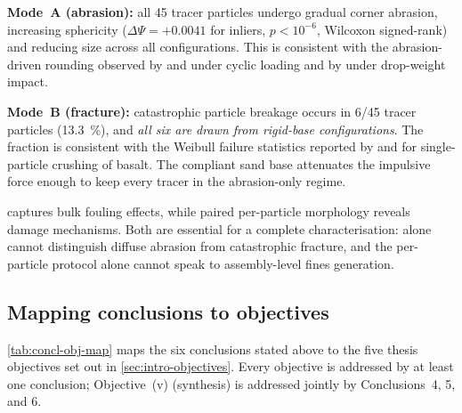 \begin{finding}[title=Conclusion 5 -- Two damage modes]
\textbf{Mode~A (abrasion):} all 45 tracer particles undergo gradual
corner abrasion, increasing sphericity ($\Delta\Psi = +0.0041$ for
inliers, $p < 10^{-6}$, Wilcoxon signed-rank) and reducing size across
all configurations. This is consistent with the abrasion-driven rounding
observed by \citet{Qian2014} and \citet{Guo2018} under cyclic loading
and by \citet{Koohmishi2020} under drop-weight impact.\par
\textbf{Mode~B (fracture):} catastrophic particle breakage occurs in
6/45 tracer particles (\SI{13.3}{\percent}), and \emph{all six are
drawn from rigid-base configurations}. The fraction is consistent with
the Weibull failure statistics reported by \citet{McDowell2002} and
\citet{Lim2004} for single-particle crushing of basalt. The compliant
sand base attenuates the impulsive force enough to keep every tracer in
the abrasion-only regime.
\end{finding}

\begin{finding}[title=Conclusion 6 -- Complementary characterisation]
\FIIN{} captures bulk fouling effects, while paired per-particle
morphology reveals damage mechanisms. Both are essential for a complete
characterisation: \FIIN{} alone cannot distinguish diffuse abrasion from
catastrophic fracture, and the per-particle protocol alone cannot speak
to assembly-level fines generation.
\end{finding}

\subsection{Mapping conclusions to objectives}

\cref{tab:concl-obj-map} maps the six conclusions stated above to the
five thesis objectives set out in \cref{sec:intro-objectives}. Every
objective is addressed by at least one conclusion; Objective~(v)
(synthesis) is addressed jointly by Conclusions~4, 5, and 6.

